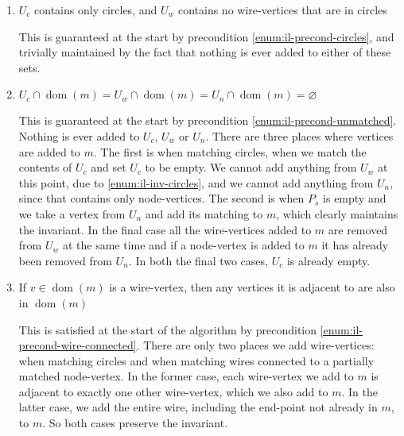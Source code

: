 \documentclass{article}
\DeclareMathOperator{\dom}{dom}
\begin{document}
\begin{enumerate}
  \renewcommand{\theenumi}{(\roman{enumi})}
  \renewcommand{\labelenumi}{\theenumi}
  \item \label{enum:il-inv-circles} $U_c$ contains only circles, and $U_w$ contains no wire-vertices that are in circles

	This is guaranteed at the start by precondition \ref{enum:il-precond-circles}, and trivially maintained by the fact that nothing is ever added to either of these sets.
  \item \label{enum:il-inv-unmatched} $U_c\cap\dom(m) = U_w\cap\dom(m) = U_n\cap\dom(m) = \varnothing$

	This is guaranteed at the start by precondition \ref{enum:il-precond-unmatched}.  Nothing is ever added to $U_c$, $U_w$ or $U_n$.  There are three places where vertices are added to $m$.  The first is when matching circles, when we match the contents of $U_c$ and set $U_c$ to be empty.  We cannot add anything from $U_w$ at this point, due to \ref{enum:il-inv-circles}, and we cannot add anything from $U_n$, since that contains only node-vertices.  The second is when $P_s$ is empty and we take a vertex from $U_n$ and add its matching to $m$, which clearly maintains the invariant.  In the final case all the wire-vertices added to $m$ are removed from $U_w$ at the same time and if a node-vertex is added to $m$ it has already been removed from $U_n$.  In both the final two cases, $U_c$ is already empty.
  \item \label{enum:il-inv-wire-connected} If $v \in \dom(m)$ is a wire-vertex, then any vertices it is adjacent to are also in $\dom(m)$

This is satisfied at the start of the algorithm by precondition \ref{enum:il-precond-wire-connected}.  There are only two places we add wire-vertices: when matching circles and when matching wires connected to a partially matched node-vertex.  In the former case, each wire-vertex we add to $m$ is adjacent to exactly one other wire-vertex, which we also add to $m$.  In the latter case, we add the entire wire, including the end-point not already in $m$, to $m$.  So both cases preserve the invariant.
\end{enumerate}
\end{document}
